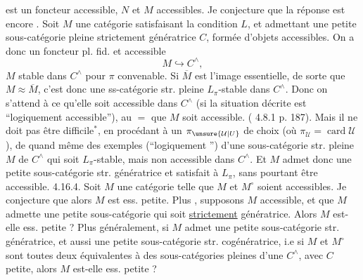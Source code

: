 est un foncteur accessible, $N$ et $M$ accessibles.
Je conjecture que la réponse est encore
.
Soit $M$ une catégorie satisfaisant la condition
$L$, et admettant une petite sous-catégorie
pleine strictement génératrice $C$, formée
d'objets accessibles. On a donc un
foncteur pl. fid. et accessible
\[
M\hookrightarrow C^{\wedge},
\]
$M$ stable dans $C^{\wedge}$ pour  $\pi$ convenable.
Si $\overline M$ est l'image essentielle, de sorte
que $M\approx\overline M$, c'est donc une ss-catégorie
str. pleine $L_\pi$-stable dans $C^{\wedge}$. Donc on
s'attend à ce qu'elle soit accessible
dans $C^{\wedge}$ (si la situation décrite est
``logiquement accessible''), 
  au $=$ que $M$ soit accessible.
( 4.8.1 p. 187). Mais il ne doit
pas être difficile$^{*}$, en procédant à un
 $\pi_{\unsure{\mathcal U|U}}$ de choix (où $\pi_{\mathcal U}=\operatorname{card}\mathcal U$), de
 quand même des exemples (``logiquement
'') d'une sous-catégorie
str. pleine $M$ de $C^{\wedge}$ qui soit $L_\pi$-stable,
mais non accessible dans $C^{\wedge}$. Et $M$
admet donc une petite sous-catégorie str.
génératrice  et satisfait à $L_\pi$, sans pourtant
être accessible.
4.16.4. Soit $M$ une catégorie telle que $M$
et $M^{\circ}$ soient accessibles. Je conjecture
que alors $M$ est ess. petite. Plus
, supposons $M$ accessible, et
que $M$ admette une petite sous-catégorie
qui soit \uline{strictement} génératrice. Alors
$M$ est-elle ess. petite ? Plus généralement,
si $M$ admet une petite sous-catégorie
str. génératrice, et aussi une petite
sous-catégorie str. cogénératrice, i.e si
$M$ et $M^{\circ}$ sont toutes deux équivalentes
à des sous-catégories pleines d'une
$C^{\wedge}$, avec $C$ petite, alors $M$ est-elle
ess. petite ?

